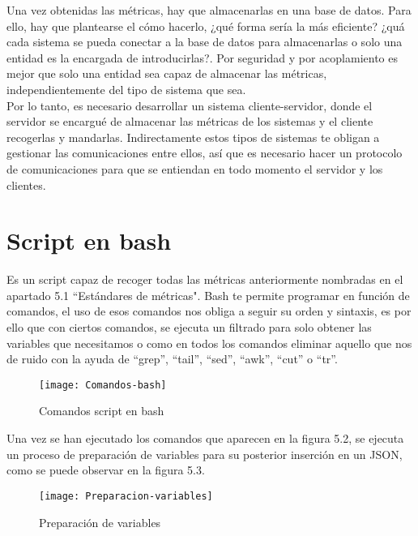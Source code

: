 \documentclass[ spanish, a4paper, 12pt, oneside]{report}
\begin{document}
Una vez obtenidas las métricas, hay que almacenarlas en una base de datos. Para ello, hay que plantearse el cómo hacerlo, ¿qué forma 
sería la más eficiente? ¿quá cada sistema se pueda conectar a la base de datos para almacenarlas o solo una entidad es la encargada 
de introducirlas?. Por seguridad y por acoplamiento es mejor que solo una entidad sea capaz de almacenar las métricas, independientemente 
del tipo de sistema que sea.\\

Por lo tanto, es necesario desarrollar un sistema cliente-servidor, donde el servidor se encargué de almacenar las métricas de los sistemas 
y el cliente recogerlas y mandarlas. Indirectamente estos tipos de sistemas te obligan a gestionar las comunicaciones entre ellos, así que es necesario 
hacer un protocolo de comunicaciones para que se entiendan en todo momento el servidor y los clientes.\\

\section{Script en bash}

Es un script capaz de recoger todas las métricas anteriormente nombradas en el apartado 5.1 ``Estándares de métricas". Bash te permite programar en función de comandos, 
el uso de esos comandos nos obliga a seguir su orden y sintaxis, es por ello que con ciertos comandos, se ejecuta un filtrado para solo obtener las variables que necesitamos o 
como en todos los comandos eliminar aquello que nos de ruido con la ayuda de ``grep'', ``tail'', ``sed'', ``awk'', ``cut'' o ``tr''.\\

\begin{figure}[!h]
   \centering
   \texttt{[image: Comandos-bash]}\\
      \caption{\label{fig: Comandos script en bash} Comandos script en bash}
\end{figure}

Una vez se han ejecutado los comandos que aparecen en la figura 5.2, se ejecuta un proceso de preparación de variables para su posterior inserción en un JSON, como se puede observar 
en la figura 5.3. \\

\begin{figure}[!h]
   \centering
   \texttt{[image: Preparacion-variables]}\\
      \caption{\label{fig: Preparación de variables} Preparación de variables}
\end{figure}
\end{document}
